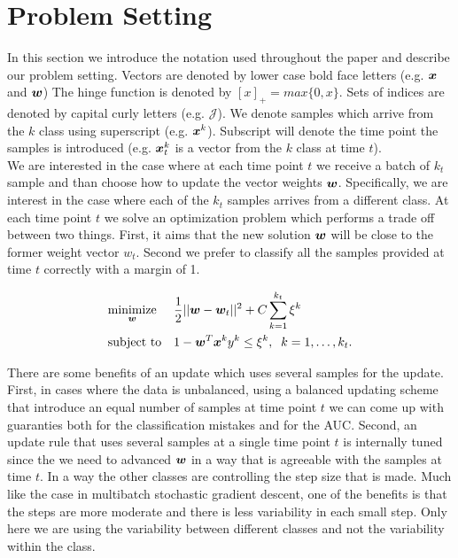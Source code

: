 \section{Problem Setting}

In this section we introduce the notation used throughout the paper and describe our problem setting. Vectors are denoted by lower case bold face letters (e.g. $\bm{x}$ and $\bm{w}$) 
The hinge function is denoted by $[x]_+ = max\{0, x\} $. Sets of indices are denoted by capital curly letters (e.g. $\mathcal{J}$). We denote samples which arrive from the $k$ class using superscript (e.g. $\bm{x}^k$). Subscript will denote the time point the samples is introduced (e.g. $\bm{x}^k_t$ is a vector from the $k$ class at time $t$). \\

We are interested in the case where at each time point $t$ we receive a batch of $k_t$ sample and than choose how to update the vector weights $\bm{w}$. Specifically, we are interest in the case where each of the $k_t$ samples arrives from a different class. At each time point $t$ we solve an optimization problem which performs a trade off between two things. First, it aims that the new solution $\bm{w}$ will be close to the former weight vector $w_t$. Second we prefer to classify all the samples provided at time $t$ correctly with a margin of 1.

\begin{equation*}
\begin{aligned}
& \underset{\bm{w}}{\text{minimize}}
& & \frac{1}{2} || \bm{w} - \bm{w}_t ||^2 + C \sum\limits_{k=1}^{k_t}{\xi^k} \\
& \text{subject to}
& & 1 - \bm{w}^T \bm{x}^k y^k \leq \xi^k, \;
 \; k = 1, \ldots, k_t.
\end{aligned}
\end{equation*}

There are some benefits of an update which uses several samples for the update. First, in cases where the data is unbalanced, using a balanced updating scheme that introduce an equal number of samples at time point $t$ we can come up with guaranties both for the classification mistakes and for the AUC.
Second, an update rule that uses several samples at a single time point $t$ is internally tuned since the we need to advanced $\bm{w}$ in a way that is agreeable with the samples at time $t$. In a way the other classes are controlling the step size that is made. Much like the case in multibatch stochastic gradient descent, one of the benefits is that the steps are more moderate and there is less variability in each small step. Only here we are using the variability between different classes and not the variability within the class.